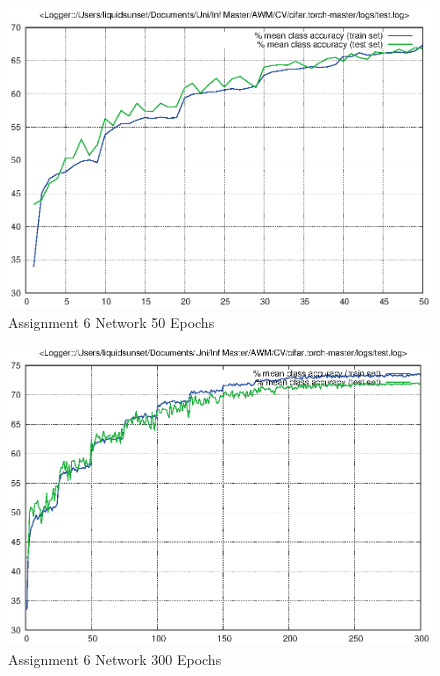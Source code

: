 \documentclass[11pt, oneside]{report}
\begin{document}
\begin{figure}[!htb]
\centering
\includegraphics[scale=.7]{logs_assignment6/50_epochs/test.eps}
\caption{Assignment 6 Network 50 Epochs}
\label{fig:digraph}
\end{figure}

\begin{figure}[!htb]
\centering
\includegraphics[scale=.7]{logs_assignment6/300_epochs/test.eps}
\caption{Assignment 6 Network 300 Epochs}
\label{fig:digraph}
\end{figure}

\FloatBarrier
\null\newpage
\end{document}
